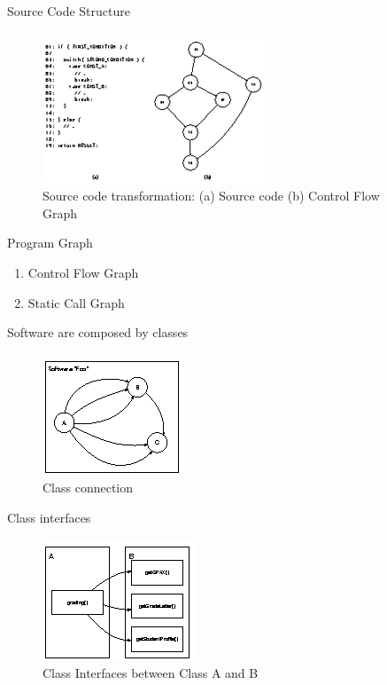 \documentclass{beamer}
\begin{document}
\begin{frame}{Source Code Structure}
    \begin{figure}
        \includegraphics[height=.7\paperheight]{figure/cfg-transform}
        \caption{Source code transformation: (a) Source code (b) Control Flow Graph}
        \label{fig:sourceCodeTransf}
    \end{figure}
\end{frame}

\begin{frame}{Program Graph}
    \begin{enumerate}
        \item<1-> Control Flow Graph
        \item<2-> Static Call Graph
    \end{enumerate}
\end{frame}

\begin{frame}{Software are composed by classes}
    \begin{figure}
        \includegraphics[width=0.6\paperwidth]{figure/class-connected}
        \caption{Class connection}
        \label{fig:classConnect}
    \end{figure}
\end{frame}

\begin{frame}{Class interfaces}
    \begin{figure}
        \includegraphics[height=0.6\paperheight]{figure/class-interfaces}
        \caption{Class Interfaces between Class A and B}
        \label{fig:classInterfaces}
    \end{figure}
\end{frame}
\end{document}
